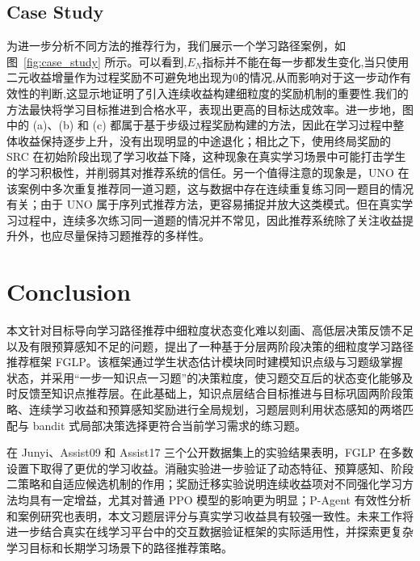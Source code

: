 \documentclass[11pt,a4paper]{article}
\begin{document}
\subsection{Case Study}
为进一步分析不同方法的推荐行为，我们展示一个学习路径案例，如图~\ref{fig:case_study} 所示。可以看到,$E_N$指标并不能在每一步都发生变化,当只使用二元收益增量作为过程奖励不可避免地出现为0的情况,从而影响对于这一步动作有效性的判断,这显示地证明了引入连续收益构建细粒度的奖励机制的重要性.我们的方法最快将学习目标推进到合格水平，表现出更高的目标达成效率。进一步地，图中的 (a)、(b) 和 (c) 都属于基于步级过程奖励构建的方法，因此在学习过程中整体收益保持逐步上升，没有出现明显的中途退化；相比之下，使用终局奖励的 SRC 在初始阶段出现了学习收益下降，这种现象在真实学习场景中可能打击学生的学习积极性，并削弱其对推荐系统的信任。另一个值得注意的现象是，UNO 在该案例中多次重复推荐同一道习题，这与数据中存在连续重复练习同一题目的情况有关；由于 UNO 属于序列式推荐方法，更容易捕捉并放大这类模式。但在真实学习过程中，连续多次练习同一道题的情况并不常见，因此推荐系统除了关注收益提升外，也应尽量保持习题推荐的多样性。
\section{Conclusion}
本文针对目标导向学习路径推荐中细粒度状态变化难以刻画、高低层决策反馈不足以及有限预算感知不足的问题，提出了一种基于分层两阶段决策的细粒度学习路径推荐框架 FGLP。该框架通过学生状态估计模块同时建模知识点级与习题级掌握状态，并采用“一步一知识点一习题”的决策粒度，使习题交互后的状态变化能够及时反馈至知识点推荐层。在此基础上，知识点层结合目标推进与目标巩固两阶段策略、连续学习收益和预算感知奖励进行全局规划，习题层则利用状态感知的两塔匹配与 bandit 式局部决策选择更符合当前学习需求的练习题。

在 Junyi、Assist09 和 Assist17 三个公开数据集上的实验结果表明，FGLP 在多数设置下取得了更优的学习收益。消融实验进一步验证了动态特征、预算感知、阶段二策略和自适应候选机制的作用；奖励迁移实验说明连续收益项对不同强化学习方法均具有一定增益，尤其对普通 PPO 模型的影响更为明显；P-Agent 有效性分析和案例研究也表明，本文习题层评分与真实学习收益具有较强一致性。未来工作将进一步结合真实在线学习平台中的交互数据验证框架的实际适用性，并探索更复杂学习目标和长期学习场景下的路径推荐策略。
\printbibliogCEraphy
\end{document}

